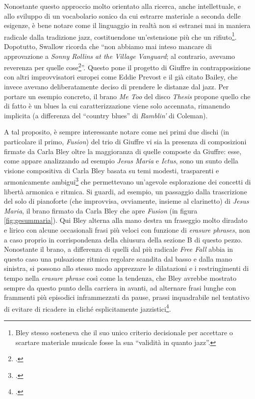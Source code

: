  Nonostante questo approccio molto orientato alla ricerca, anche intellettuale, e allo sviluppo di un vocabolario sonico da cui estrarre materiale a seconda delle esigenze, è bene notare come il linguaggio in realtà non si estranei mai in maniera radicale dalla tradizione jazz, costituendone un'estensione più che un rifiuto\footnote{Bley stesso sosteneva che il suo unico criterio decisionale per accettare o scartare materiale musicale fosse la sua ``validità in quanto jazz''.\cite[17]{heckman}}. Dopotutto, Swallow ricorda che ``non abbiamo mai inteso mancare di approvazione a \textit{Sonny Rollins at the Village Vanguard}; al contrario, avevamo reverenza per quelle cose\footcite[388]{johnston}''. Questo pone il progetto di Giuffre in contrapposizione con altri improvvisatori europei come Eddie Prevost e il già citato Bailey, che invece avevano deliberatamente deciso di prendere le distanze dal jazz. Per portare un esempio concreto, il brano \textit{Me Too} del disco \textit{Thesis} propone quello che di fatto è un blues la cui caratterizzazione viene solo accennata, rimanendo implicita (a differenza del ``country blues'' di \textit{Ramblin'} di Coleman). \par
 A tal proposito, è sempre interessante notare come nei primi due dischi (in particolare il primo, \textit{Fusion}) del trio di Giuffre vi sia la presenza di composizioni firmate da Carla Bley oltre la maggioranza di quelle composte da Giuffre: esse, come appare analizzando ad esempio \textit{Jesus Maria} e \textit{Ictus}, sono un sunto della visione compositiva di Carla Bley basata su temi modesti, trasparenti e armonicamente ambigui\footcite[25]{carla} che permettevano un'agevole esplorazione dei concetti di libertà armonica e ritmica.
 Si guardi, ad esempio, un passaggio dalla trascrizione del solo di pianoforte (che improvvisa, ovviamente, insieme al clarinetto) di \textit{Jesus Maria}, il brano firmato da Carla Bley che apre \textit{Fusion} (in figura \ref{fig:gesummaria}). Qui Bley alterna alla mano destra un fraseggio molto diradato e lirico con alcune occasionali frasi più veloci con funzione di \textit{erasure phrases}, non a caso proprio in corrispondenza della chiusura della sezione B di questo pezzo. Nonostante il brano, a differenza di quelli dal più radicale \textit{Free Fall} abbia in questo caso una pulsazione ritmica regolare scandita dal basso e dalla mano sinistra, si possono allo stesso modo apprezzare le dilatazioni e i restringimenti di tempo nella \textit{erasure phrase} così come la tendenza, che Bley avrebbe mostrato sempre da questo punto della carriera in avanti, ad alternare frasi lunghe con frammenti più episodici inframmezzati da pause, prassi inquadrabile nel tentativo di evitare di ricadere in cliché esplicitamente jazzistici\footcite[107]{dean}.

